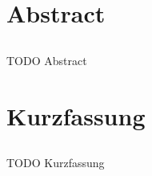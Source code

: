 \chapter*{Abstract}
\section*{\thesistitleGB}
TODO Abstract
 
\clearpage{\pagestyle{empty}\cleardoublepage}
\chapter*{Kurzfassung}
\section*{\thesistitle}
TODO Kurzfassung
